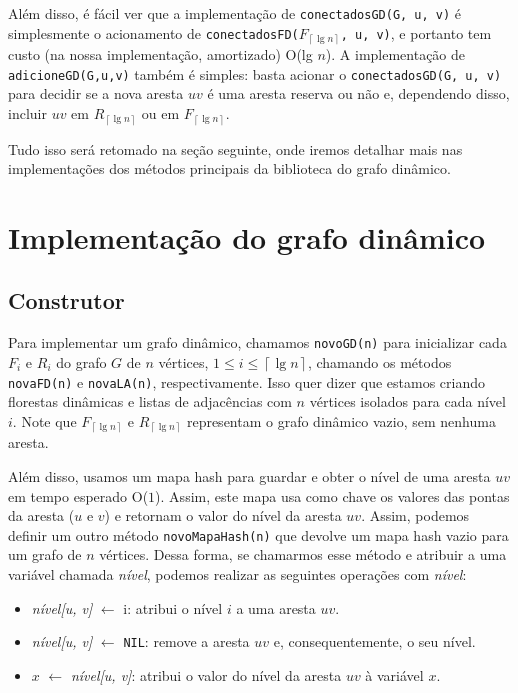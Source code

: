 Além disso, é fácil ver que a implementação de \texttt{conectadosGD(G, u, v)} é simplesmente o acionamento de \texttt{conectadosFD($F_{\left\lceil \lg n \right\rceil}$, u, v)}, e portanto tem custo (na nossa implementação, amortizado) O(lg $n$). A implementação de \texttt{adicioneGD(G,u,v)} também é simples: basta acionar o \texttt{conectadosGD(G, u, v)} para decidir se a nova aresta $uv$ é uma aresta reserva ou não e, dependendo disso, incluir $uv$ em $R_{\left\lceil \lg n \right\rceil}$ ou em $F_{\left\lceil \lg n \right\rceil}$. 

Tudo isso será retomado na seção seguinte, onde iremos detalhar mais nas implementações dos métodos principais da biblioteca do grafo dinâmico. 

\section{Implementação do grafo dinâmico}
\label{sec:dynamic-graph-implementation}

\subsection{Construtor}
\label{sec:code-constructor}

Para implementar um grafo dinâmico, chamamos \texttt{novoGD(n)} para inicializar cada $F_i$ e $R_i$ do grafo $G$ de $n$ vértices, $1 \leq i \leq \left\lceil \lg n \right\rceil$, chamando os métodos \texttt{novaFD(n)} e \texttt{novaLA(n)}, respectivamente. Isso quer dizer que estamos criando florestas dinâmicas e listas de adjacências com $n$ vértices isolados para cada nível $i$. Note que $F_{\left\lceil \lg n \right\rceil}$ e $R_{\left\lceil \lg n \right\rceil}$ representam o grafo dinâmico vazio, sem nenhuma aresta. 

Além disso, usamos um mapa hash para guardar e obter o nível de uma aresta $uv$ em tempo esperado O($1$). Assim, este mapa usa como chave os valores das pontas da aresta ($u$ e $v$) e retornam o valor do nível da aresta $uv$. Assim, podemos definir um outro método \texttt{novoMapaHash(n)} que devolve um mapa hash vazio para um grafo de $n$ vértices. Dessa forma, se chamarmos esse método e atribuir a uma variável chamada \textit{nível}, podemos realizar as seguintes operações com \textit{nível}:

\begin{itemize}
    \item \textit{nível[u, v]} $\leftarrow$ i: atribui o nível $i$ a uma aresta $uv$. 
    
    \item \textit{nível[u, v]} $\leftarrow$ \texttt{NIL}: remove a aresta $uv$ e, consequentemente, o seu nível.
    
    \item $x$ $\leftarrow$ \textit{nível[u, v]}: atribui o valor do nível da aresta $uv$ à variável $x$. 
\end{itemize}


